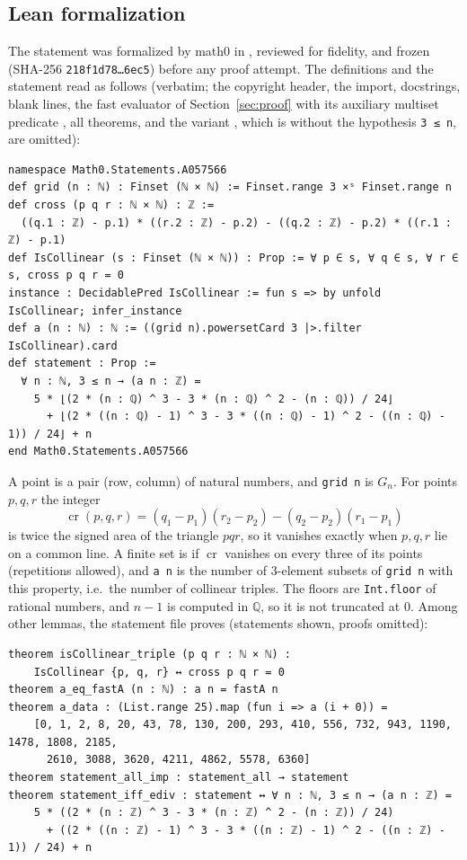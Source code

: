 \documentclass[11pt]{amsart}
\theoremstyle{plain}
\theoremstyle{definition}
\newcommand{\Q}{\mathbb{Q}}
\newcommand{\cross}{\operatorname{cr}}
\begin{document}
\subsection*{Lean formalization}
The statement was formalized by math0 in , reviewed for fidelity, and frozen (SHA-256 \texttt{218f1d78\ldots 6ec5}) before any proof attempt. The definitions and the statement read as follows (verbatim; the copyright header, the import, docstrings, blank lines, the fast evaluator of Section~\ref{sec:proof} with its auxiliary multiset predicate , all theorems, and the variant , which is  without the hypothesis \texttt{3 ≤ n}, are omitted):
\begin{lstlisting}
namespace Math0.Statements.A057566
def grid (n : ℕ) : Finset (ℕ × ℕ) := Finset.range 3 ×ˢ Finset.range n
def cross (p q r : ℕ × ℕ) : ℤ :=
  ((q.1 : ℤ) - p.1) * ((r.2 : ℤ) - p.2) - ((q.2 : ℤ) - p.2) * ((r.1 : ℤ) - p.1)
def IsCollinear (s : Finset (ℕ × ℕ)) : Prop := ∀ p ∈ s, ∀ q ∈ s, ∀ r ∈ s, cross p q r = 0
instance : DecidablePred IsCollinear := fun s => by unfold IsCollinear; infer_instance
def a (n : ℕ) : ℕ := ((grid n).powersetCard 3 |>.filter IsCollinear).card
def statement : Prop :=
  ∀ n : ℕ, 3 ≤ n → (a n : ℤ) =
    5 * ⌊(2 * (n : ℚ) ^ 3 - 3 * (n : ℚ) ^ 2 - (n : ℚ)) / 24⌋
      + ⌊(2 * ((n : ℚ) - 1) ^ 3 - 3 * ((n : ℚ) - 1) ^ 2 - ((n : ℚ) - 1)) / 24⌋ + n
end Math0.Statements.A057566
\end{lstlisting}
A point is a pair (row, column) of natural numbers, and \texttt{grid n} is $G_n$. For points $p,q,r$ the integer
\[
  \cross(p,q,r)=(q_1-p_1)(r_2-p_2)-(q_2-p_2)(r_1-p_1)
\]
is twice the signed area of the triangle $pqr$, so it vanishes exactly when $p,q,r$ lie on a common line. A finite set is  if $\cross$ vanishes on every three of its points (repetitions allowed), and \texttt{a n} is the number of $3$-element subsets of \texttt{grid n} with this property, i.e.\ the number of collinear triples. The floors are \texttt{Int.floor} of rational numbers, and $n-1$ is computed in $\Q$, so it is not truncated at $0$. Among other lemmas, the statement file proves (statements shown, proofs omitted):
\begin{lstlisting}
theorem isCollinear_triple (p q r : ℕ × ℕ) :
    IsCollinear {p, q, r} ↔ cross p q r = 0
theorem a_eq_fastA (n : ℕ) : a n = fastA n
theorem a_data : (List.range 25).map (fun i => a (i + 0)) =
    [0, 1, 2, 8, 20, 43, 78, 130, 200, 293, 410, 556, 732, 943, 1190, 1478, 1808, 2185,
      2610, 3088, 3620, 4211, 4862, 5578, 6360]
theorem statement_all_imp : statement_all → statement
theorem statement_iff_ediv : statement ↔ ∀ n : ℕ, 3 ≤ n → (a n : ℤ) =
    5 * ((2 * (n : ℤ) ^ 3 - 3 * (n : ℤ) ^ 2 - (n : ℤ)) / 24)
      + ((2 * ((n : ℤ) - 1) ^ 3 - 3 * ((n : ℤ) - 1) ^ 2 - ((n : ℤ) - 1)) / 24) + n
\end{lstlisting}
\end{document}
